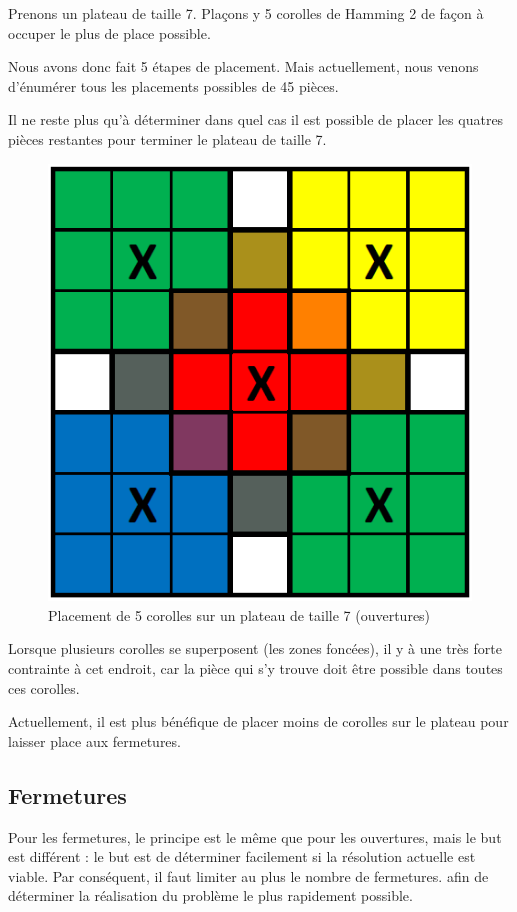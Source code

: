 	\begin{exmp}
		Prenons un plateau de taille 7. Plaçons y 5 corolles de Hamming 2 de façon à occuper le plus de place possible.
		
		Nous avons donc fait 5 étapes de placement. Mais actuellement, nous venons d'énumérer tous les placements possibles de 45 pièces.
		
		Il ne reste plus qu'à déterminer dans quel cas il est possible de placer les quatres pièces restantes pour terminer le plateau de taille 7.
		
		\begin{figure}[H]
			\begin{center}
				\includegraphics[width=0.5\linewidth]{images/corolle_placement}
			\end{center}
			\caption{Placement de 5 corolles sur un plateau de taille 7 (ouvertures)}\label{fig:corolle_placement}
		\end{figure}
		
		Lorsque plusieurs corolles se superposent (les zones foncées), il y à une très forte contrainte à cet endroit, car la pièce qui s'y trouve doit être possible dans toutes ces corolles.
	\end{exmp}
	
	\begin{rem}
		Actuellement, il est plus bénéfique de placer moins de corolles sur le plateau pour laisser place aux fermetures.	
	\end{rem}
\newpage	

	\subsection{Fermetures}
	
		Pour les fermetures, le principe est le même que pour les ouvertures, mais le but est différent : le but est de déterminer facilement si la résolution actuelle est viable. Par conséquent, il faut limiter au plus le nombre de fermetures. afin de déterminer la réalisation du problème le plus rapidement possible.
		
